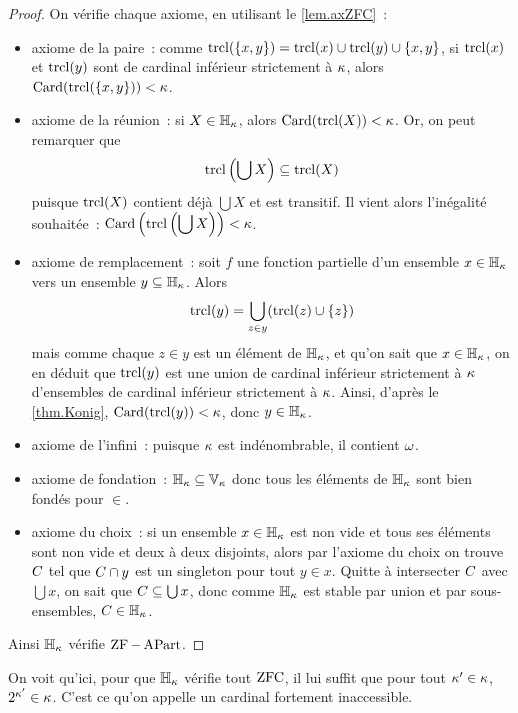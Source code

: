 \begin{proof}
  On vérifie chaque axiome, en utilisant le \cref{lem.axZFC}~:
  \begin{itemize}
  \item axiome de la paire~: comme
    $\operatorname{trcl}(\{x,y\}) = \operatorname{trcl}(x) \cup \operatorname{trcl}(y) \cup \{x,y\}$, si
    $\operatorname{trcl}(x)$ et $\operatorname{trcl}(y)$ sont de cardinal inférieur strictement à $\kappa$,
    alors $\operatorname{Card}(\operatorname{trcl}(\{x,y\})) < \kappa$.
  \item axiome de la réunion~: si $X\in \mathbb H_\kappa$, alors
    $\operatorname{Card}(\operatorname{trcl}(X)) < \kappa$. Or, on peut remarquer que
    \[\operatorname{trcl}\left(\bigcup X\right)\subseteq \operatorname{trcl}(X)\]
    puisque $\operatorname{trcl}(X)$ contient déjà $\bigcup X$ et est transitif. Il vient
    alors l'inégalité souhaitée~:
    $\displaystyle\operatorname{Card}\left(\operatorname{trcl}\left(\bigcup X\right)\right) < \kappa$.
  \item axiome de remplacement~: soit $f$ une fonction partielle d'un
    ensemble $x \in \mathbb H_\kappa$ vers un ensemble $y \subseteq \mathbb H_\kappa$. Alors
    \[\operatorname{trcl}(y) = \bigcup_{z \in y} (\operatorname{trcl}(z)\cup \{z\})\]
    mais comme chaque $z \in y$ est un élément de $\mathbb H_\kappa$, et qu'on sait que
    $x \in \mathbb H_\kappa$, on en déduit que $\operatorname{trcl}(y)$ est une union de cardinal
    inférieur strictement à $\kappa$ d'ensembles de cardinal inférieur
    strictement à $\kappa$. Ainsi, d'après le \cref{thm.Konig},
    $\operatorname{Card}(\operatorname{trcl}(y)) < \kappa$, donc $y \in \mathbb H_\kappa$.
  \item axiome de l'infini~: puisque $\kappa$ est indénombrable, il contient
    $\omega$.
  \item axiome de fondation~: $\mathbb H_\kappa \subseteq \mathbb V_\kappa$ donc
    tous les éléments de $\mathbb H_\kappa$ sont bien fondés pour $\in$.
  \item axiome du choix~: si un ensemble $x \in \mathbb H_\kappa$ est non vide
    et tous ses éléments sont non vide et deux à deux disjoints, alors par
    l'axiome du choix on trouve $C$ tel que $C \cap y$ est un
    singleton pour tout $y \in x$. Quitte à intersecter $C$ avec
    $\bigcup x$, on sait que $C\subseteq \bigcup x$, donc comme
    $\mathbb H_\kappa$ est stable par union et par sous-ensembles,
    $C \in \mathbb H_\kappa$.
  \end{itemize}
  Ainsi $\mathbb H_\kappa$ vérifie $\operatorname{ZF} - \operatorname{APart}$.
\end{proof}

On voit qu'ici, pour que $\mathbb H_\kappa$ vérifie tout $\operatorname{ZFC}$, il lui suffit que pour
tout $\kappa' \in \kappa$, $2^{\kappa'} \in \kappa$. C'est ce qu'on appelle un
cardinal fortement inaccessible.

